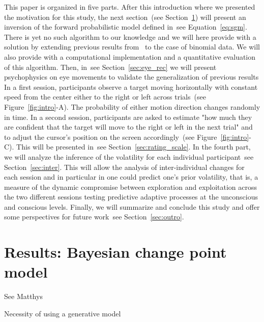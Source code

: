 \documentclass[profile,final,english, draft]{article}%
\newcommand{\citet}[1]{\textcite{#1}}
\newcommand{\seeFig}[1]{see Figure~\ref{fig:#1}}
\newcommand{\seeEq}[1]{see Equation~\ref{eq:#1}}
\newcommand{\seeSec}[1]{see Section~\ref{sec:#1}}
\begin{document}
This paper is organized in five parts.
After this introduction where we presented the motivation for this study, 
the next section~(\seeSec{bayesian_change_point}) will present
an inversion of the forward probabilistic model defined in~\seeEq{sgm}.
There is yet no such algorithm to our knowledge and
we will here provide with a solution
by extending previous results from~\citet{AdamsMackay2007}
to the case of binomial data.
We will also provide with a computational implementation
and a quantitative evaluation of this algorithm.
Then, in~\seeSec{eye_rec} we will present psychophysics on eye movements
to validate the generalization of previous results
In a first session, participants observe a target moving horizontally
with constant speed from the center
either to the right or left across trials~(\seeFig{intro}-A).
The probability of either motion direction changes randomly in time.
In a second session, participants are asked to estimate
"how much they are confident that
the target will move to the right or left in the next trial" and
to adjust the cursor's position on the screen accordingly~(\seeFig{intro}-C).
This will be presented in~\seeSec{rating_scale}.
In the fourth part, we will analyze the inference of the volatility
for each individual participant~\seeSec{inter}.
This will allow the analysis of inter-individual changes for each session
and in particular in one could predict one's prior volatility,
that is, a measure of the dynamic compromise between exploration and exploitation
across the two different sessions testing predictive adaptive processes
at the unconscious and conscious levels.
Finally, we will summarize and conclude this study and
offer some perspectives for future work~\seeSec{outro}.
\section{Results: Bayesian change point model}
\label{sec:bayesian_change_point}




See Matthys

Necessity of using a generative model
\end{document}

